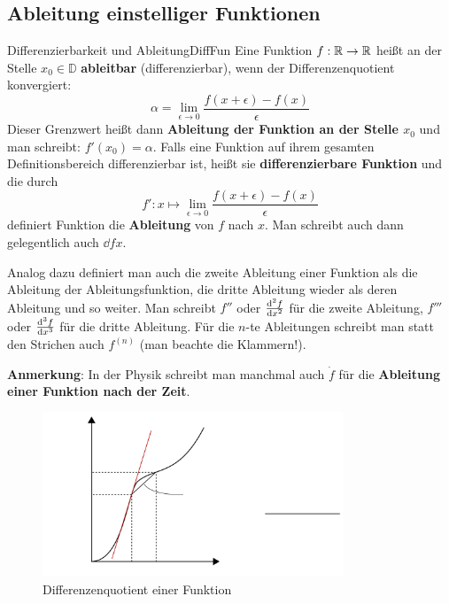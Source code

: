 \subsection{Ableitung einstelliger Funktionen}

\begin{definition}{Differenzierbarkeit und Ableitung}{DiffFun}
    Eine Funktion $f: \mathbb{R} \to \mathbb{R}$ heißt an der Stelle $x_0\in\mathbb{D}$ \textbf{ableitbar} (differenzierbar), wenn der Differenzenquotient konvergiert:
    $$
        \alpha = \lim\limits_{\epsilon\to 0} \frac{f(x+\epsilon) - f(x)}{\epsilon}
    $$
    Dieser Grenzwert heißt dann \textbf{Ableitung der Funktion an der Stelle $x_0$} und man schreibt: $f'(x_0) = \alpha$.
    Falls eine Funktion auf ihrem gesamten Definitionsbereich differenzierbar ist, heißt sie \textbf{differenzierbare Funktion} und die durch
    $$
    f': x \mapsto \lim\limits_{\epsilon\to 0} \frac{f(x+\epsilon) - f(x)}{\epsilon}
    $$
    definiert Funktion die \textbf{Ableitung} von $f$ nach $x$. Man schreibt auch dann gelegentlich auch $\dd{f}{x}$.
\end{definition}

Analog dazu definiert man auch die zweite Ableitung einer Funktion als die Ableitung der Ableitungsfunktion, die dritte Ableitung wieder als deren Ableitung und so weiter. Man schreibt $f''$ oder $\frac{\mathrm{d}^{2}{f}}{\mathrm{d}{x^{2}}}$ für die zweite Ableitung, $f'''$ oder $\frac{\mathrm{d}^{3}{f}}{\mathrm{d}{x^{3}}}$ für die dritte Ableitung. Für die $n$-te Ableitungen schreibt man statt den Strichen auch $f^{(n)}$ (man beachte die Klammern!).

\textbf{Anmerkung}: In der Physik schreibt man manchmal auch $\dot{f}$ für die \textbf{Ableitung einer Funktion nach der Zeit}.

\begin{figure}
    \centering
    \includegraphics[width=0.8\textwidth]{./svg/derivative-function}
    \caption{Differenzenquotient einer Funktion}
    \label{fig:DiffFun}
\end{figure}

